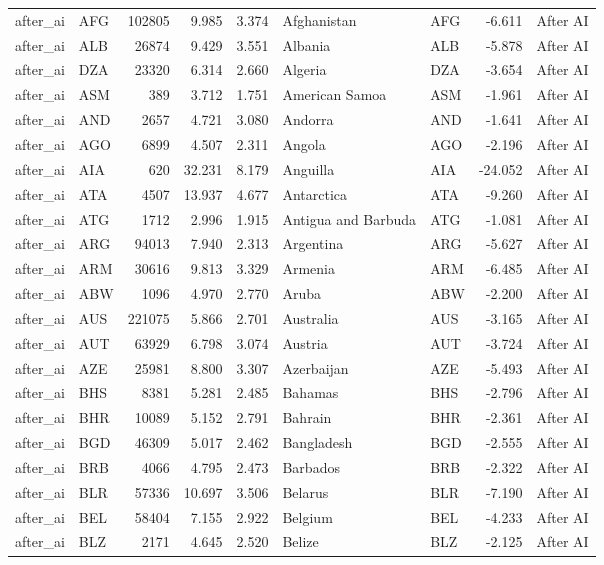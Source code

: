 \begin{tabular}{llrrrllrl}
after\_ai & AFG & 102805 & 9.985 & 3.374 & Afghanistan & AFG & -6.611 & After AI \\
after\_ai & ALB & 26874 & 9.429 & 3.551 & Albania & ALB & -5.878 & After AI \\
after\_ai & DZA & 23320 & 6.314 & 2.660 & Algeria & DZA & -3.654 & After AI \\
after\_ai & ASM & 389 & 3.712 & 1.751 & American Samoa & ASM & -1.961 & After AI \\
after\_ai & AND & 2657 & 4.721 & 3.080 & Andorra & AND & -1.641 & After AI \\
after\_ai & AGO & 6899 & 4.507 & 2.311 & Angola & AGO & -2.196 & After AI \\
after\_ai & AIA & 620 & 32.231 & 8.179 & Anguilla & AIA & -24.052 & After AI \\
after\_ai & ATA & 4507 & 13.937 & 4.677 & Antarctica & ATA & -9.260 & After AI \\
after\_ai & ATG & 1712 & 2.996 & 1.915 & Antigua and Barbuda & ATG & -1.081 & After AI \\
after\_ai & ARG & 94013 & 7.940 & 2.313 & Argentina & ARG & -5.627 & After AI \\
after\_ai & ARM & 30616 & 9.813 & 3.329 & Armenia & ARM & -6.485 & After AI \\
after\_ai & ABW & 1096 & 4.970 & 2.770 & Aruba & ABW & -2.200 & After AI \\
after\_ai & AUS & 221075 & 5.866 & 2.701 & Australia & AUS & -3.165 & After AI \\
after\_ai & AUT & 63929 & 6.798 & 3.074 & Austria & AUT & -3.724 & After AI \\
after\_ai & AZE & 25981 & 8.800 & 3.307 & Azerbaijan & AZE & -5.493 & After AI \\
after\_ai & BHS & 8381 & 5.281 & 2.485 & Bahamas & BHS & -2.796 & After AI \\
after\_ai & BHR & 10089 & 5.152 & 2.791 & Bahrain & BHR & -2.361 & After AI \\
after\_ai & BGD & 46309 & 5.017 & 2.462 & Bangladesh & BGD & -2.555 & After AI \\
after\_ai & BRB & 4066 & 4.795 & 2.473 & Barbados & BRB & -2.322 & After AI \\
after\_ai & BLR & 57336 & 10.697 & 3.506 & Belarus & BLR & -7.190 & After AI \\
after\_ai & BEL & 58404 & 7.155 & 2.922 & Belgium & BEL & -4.233 & After AI \\
after\_ai & BLZ & 2171 & 4.645 & 2.520 & Belize & BLZ & -2.125 & After AI \\

\end{tabular}
